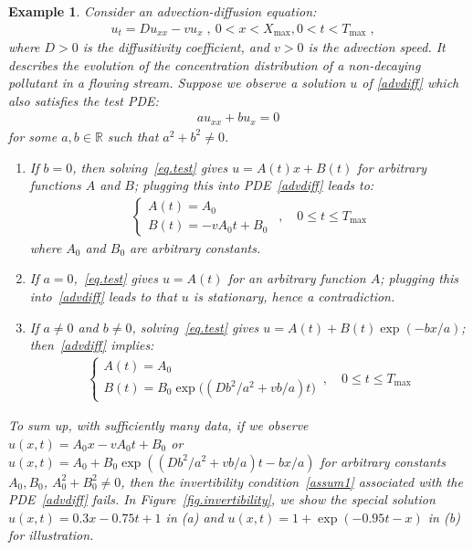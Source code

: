 \documentclass[a4paper,11pt]{article}
\newtheorem{example}{Example}[section]
\begin{document}
\begin{example}
Consider an advection-diffusion equation:
\begin{align}
&u_t=Du_{xx}-vu_x\;,~0<x<X_{\max},0<t<T_{\max}\;,\label{advdiff}
\end{align}
where $D>0$ is the diffusitivity coefficient, and $v>0$ is the advection speed. It describes the evolution of the concentration distribution of a non-decaying pollutant in a flowing stream. Suppose we observe a solution $u$ of \eqref{advdiff} which also satisfies the test PDE:
\begin{align}
au_{xx}+bu_{x}=0\label{eq.test}	
\end{align}
for some $a,b\in\mathbb{R}$ such that $a^2+b^2\neq 0$. 
\begin{enumerate}
\item If $b= 0$, then solving~\eqref{eq.test} gives $u=A(t)x+B(t)$ for arbitrary functions $A$ and $B$; plugging this into PDE~\eqref{advdiff} leads to:
\begin{align}
\begin{cases}
A(t)=A_0\\
B(t) = -vA_0t+B_0\;
\end{cases}\,,\quad 0\leq t\leq T_{\max}
\end{align}
where $A_0$ and $B_0$ are arbitrary constants. 
\item If $a=0$,~\eqref{eq.test} gives $u=A(t)$ for an arbitrary function $A$; plugging this into~\eqref{advdiff} leads to  that $u$ is stationary, hence a contradiction.
\item If $a\neq0$ and $b\neq 0$,  solving~\eqref{eq.test} gives $u=A(t)+B(t)\exp(-bx/a)$; then~\eqref{advdiff} implies:
\begin{align}
\begin{cases}
A(t)=A_0\\
B(t)=B_0\exp\big((Db^2/a^2+vb/a)t\big)
\end{cases}\,,\quad 0\leq t\leq T_{\max}\label{test3}	
\end{align}
\end{enumerate}
To sum up, with sufficiently many data, if we observe $u(x,t)=A_0x-vA_0t+B_0$ or $u(x,t)=A_0+B_0\exp((Db^2/a^2+vb/a)t-bx/a)$ for arbitrary constants $A_0,B_0$, $A_0^2+B_0^2\neq 0$, then the invertibility condition~\eqref{assum1} associated with the PDE~\eqref{advdiff} fails. In Figure~\ref{fig.invertibility}, we show the special solution $u(x,t)=0.3x-0.75t+1$ in (a) and $u(x,t)=1+\exp(-0.95t-x)$ in (b) for illustration. 
\end{example}
\end{document}
